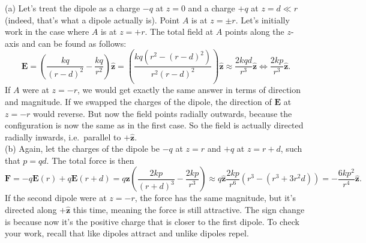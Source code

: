 \documentclass[../TST.tex]{subfiles}
\begin{document}
\ifprob \else
\begin{solution} (a) Let's treat the dipole as a charge $-q$ at $z=0$ and a charge $+q$ at $z=d\ll r$ (indeed, that's what a dipole actually is). Point $A$ is at $z=\pm r$. Let's initially work in the case where $A$ is at $z=+r$. The total field at $A$ points along the $z$-axis and can be found as follows:
	\begin{equation*}
		\mathbf{E}=\left( \frac{kq}{(r-d)^2}-\frac{kq}{r^2}\right)\hat{\mathbf{z}}=\left(\frac{kq(r^2-(r-d)^2)}{r^2(r-d)^2}\right)\hat{\mathbf{z}}\approx 	\frac{2kqd}{r^3}\hat{\mathbf{z}}\Leftrightarrow \boxed{\frac{2kp}{r^3}\hat{\mathbf{z}}.}
	\end{equation*}
If $A$ were at $z=-r$, we would get exactly the same answer in terms of direction and magnitude. If we swapped the charges of the dipole, the direction of $\mathbf{E}$ at $z=-r$ would reverse. But now the field points radially outwards, because the configuration is now the same as in the first case. So the field is actually directed radially inwards, i.e.\ parallel to $+\hat{\mathbf{z}}$.\\

(b) Again, let the charges of the dipole be $-q$ at $z=r$ and $+q$ at $z=r+d$, such that $p=qd$. The total force is then
\begin{equation*}
	\mathbf{F}=-q\mathbf{E}(r)+q\mathbf{E}(r+d)=q \hat{\mathbf{z}} \left(\frac{2kp}{(r+d)^3}-\frac{2kp}{r^3}\right)\approx q \hat{\mathbf{z}} \frac{2kp}{r^6} \left(r^3-(r^3+3r^2d)\right)=\boxed{-\frac{6kp^2}{r^4}\hat{\mathbf{z}}.}
\end{equation*}
If the second dipole were at $z=-r$, the force has the same magnitude, but it's directed along $+\hat{\mathbf{z}}$ this time, meaning the force is still attractive. The sign change is because now it's the positive charge that is closer to the first dipole. To check your work, recall that like dipoles attract and unlike dipoles repel.\\


\end{solution}
\end{document}
